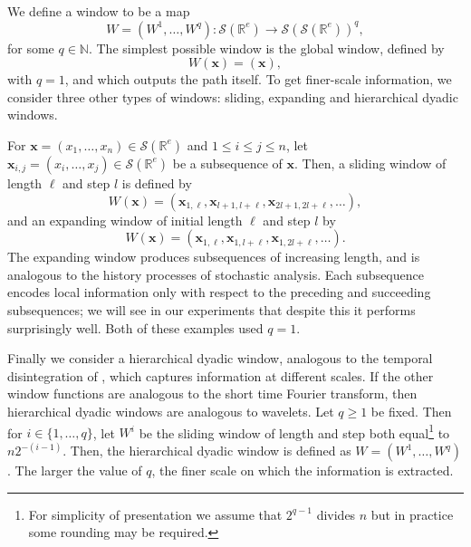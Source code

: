 \documentclass{article}
\theoremstyle{definition}
\theoremstyle{remark}
\newcommand{\reals}{\mathbb{R}}
\newcommand{\naturals}{\mathbb{N}}
\newcommand{\tseries}[1]{\mathcal{S}(#1)}
\begin{document}
	We define a window to be a map 
	\begin{equation*}
	W = (W^1, \ldots, W^q) \colon \tseries{\reals^e} \to \tseries{\tseries{\reals^e}}^q,
	\end{equation*}
	for some $q \in \naturals$. The simplest possible window is the global window, defined by
	\begin{equation}\label{eq:globalwindow}
	W(\mathbf{x}) = (\mathbf{x}),
	\end{equation}
	with $q=1$, and which outputs the path itself. To get finer-scale information, we consider three other types of windows: sliding, expanding and hierarchical dyadic windows.

	For $\mathbf{x} =  (x_1, \ldots, x_n) \in \tseries{\reals^e}$ and $ 1 \leq i \leq j \leq n$, let $\mathbf{x}_{i,j} = (x_i, \ldots, x_j) \in \tseries{\reals^e}$ be a subsequence of $\mathbf{x}$. Then, a sliding window of length $\ell$ and step $l$ is defined by
	\begin{equation}\label{eq:slidingwindow}
	W(\mathbf{x})  = (\mathbf{x}_{1, \ell}, \mathbf{x}_{l + 1, l + \ell}, \mathbf{x}_{2l + 1, 2l + \ell}, \ldots),
	\end{equation}
	and an expanding window of initial length $\ell$ and step $l$ by
	\begin{equation}\label{eq:expandingwindow}
	W(\mathbf{x}) = (\mathbf{x}_{1, \ell}, \mathbf{x}_{1, l + \ell}, \mathbf{x}_{1, 2l + \ell}, \ldots).
	\end{equation}
	The expanding window produces subsequences of increasing length, and is analogous to the history processes of stochastic analysis. Each subsequence encodes local information only with respect to the preceding and succeeding subsequences; we will see in our experiments that despite this it performs surprisingly well. Both of these examples used $q = 1$.

	Finally we consider a hierarchical dyadic window, analogous to the temporal disintegration of \citet{yang2016rotation, yang2017leveraging}, which captures information at different scales. If the other window functions are analogous to the short time Fourier transform, then hierarchical dyadic windows are analogous to wavelets. Let $q \geq 1$ be fixed. Then for $i \in \{1, \ldots, q\}$, let $W^i$ be the sliding window of length and step both equal\footnote{For simplicity of presentation we assume that $2^{q - 1}$ divides $n$ but in practice some rounding may be required.} to $n2^{-(i - 1)}$. Then, the hierarchical dyadic window is defined as $W=(W^1,\dots, W^q)$. The larger the value of $q$, the finer scale on which the information is extracted.
	
\end{document}
